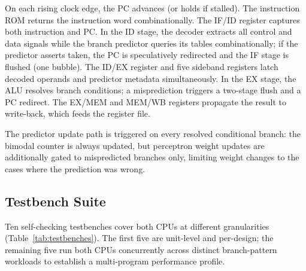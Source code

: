 \documentclass[12pt,a4paper]{article}
\begin{document}
On each rising clock edge, the PC advances (or holds if stalled). The instruction
ROM returns the instruction word combinationally. The IF/ID register captures both
instruction and PC. In the ID stage, the decoder extracts all control and data
signals while the branch predictor queries its tables combinationally; if the
predictor asserts taken, the PC is speculatively redirected and the IF stage is
flushed (one bubble). The ID/EX register and five sideband registers latch decoded
operands and predictor metadata simultaneously. In the EX stage, the ALU resolves
branch conditions; a misprediction triggers a two-stage flush and a PC redirect.
The EX/MEM and MEM/WB registers propagate the result to write-back, which feeds
the register file.

The predictor update path is triggered on every resolved conditional branch: the
bimodal counter is always updated, but perceptron weight updates are additionally
gated to mispredicted branches only, limiting weight changes to the cases where
the prediction was wrong.

\subsection{Testbench Suite}
\label{sec:testbench}

Ten self-checking testbenches cover both CPUs at different granularities
(Table~\ref{tab:testbenches}). The first five are unit-level and per-design;
the remaining five run both CPUs concurrently across distinct branch-pattern
workloads to establish a multi-program performance profile.
\end{document}
